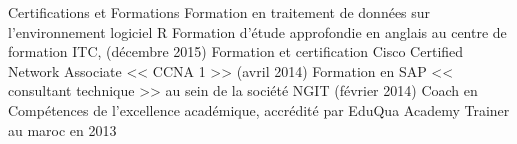 \begin{rubric}{Certifications et Formations}
\entry*[]	 Formation en traitement de données sur l'environnement logiciel R
\entry*[]	 Formation d'étude approfondie en anglais au centre de formation ITC, (décembre 2015) %
\entry*[]	 Formation et certification Cisco Certified Network Associate << CCNA 1 >> (avril 2014) %
\entry*[]	 Formation en SAP << consultant technique >> au sein de la société NGIT (février 2014) %
\entry*[] Coach en Compétences de l'excellence académique, accrédité par EduQua Academy Trainer au maroc en 2013 %
\end{rubric}
